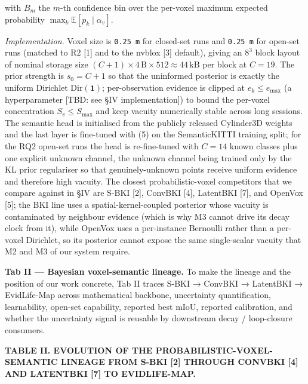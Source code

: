 \documentclass[
]{article}
\begin{document}
with \(B_m\) the \(m\)-th confidence bin over the per-voxel maximum
expected probability \(\max_k \mathbb{E}[p_k \mid \alpha_v]\).

\emph{Implementation.} Voxel size is \texttt{0.25\ m} for closed-set
runs and \texttt{0.25\ m} for open-set runs (matched to R2 {[}1{]} and
to the nvblox {[}3{]} default), giving an \(8^3\) block layout of
nominal storage size
\((C+1) \times 4\,\text{B} \times 512 \approx 44\,\text{kB}\) per block
at \(C = 19\). The prior strength is \(s_0 = C + 1\) so that the
uninformed posterior is exactly the uniform Dirichlet
\(\mathrm{Dir}(\mathbf{1})\); per-observation evidence is clipped at
\(e_k \le e_{\max}\) (a hyperparameter {[}TBD: see §IV
implementation{]}) to bound the per-voxel concentration
\(S_v \le S_{\max}\) and keep vacuity numerically stable across long
sessions. The semantic head is initialised from the publicly released
Cylinder3D weights and the last layer is fine-tuned with (5) on the
SemanticKITTI training split; for the RQ2 open-set runs the head is
re-fine-tuned with \(C = 14\) known classes plus one explicit unknown
channel, the unknown channel being trained only by the KL prior
regulariser so that genuinely-unknown points receive uniform evidence
and therefore high vacuity. The closest probabilistic-voxel competitors
that we compare against in §IV are S-BKI {[}2{]}, ConvBKI {[}4{]},
LatentBKI {[}7{]}, and OpenVox {[}5{]}; the BKI line uses a
spatial-kernel-coupled posterior whose vacuity is contaminated by
neighbour evidence (which is why M3 cannot drive its decay clock from
it), while OpenVox uses a per-instance Bernoulli rather than a per-voxel
Dirichlet, so its posterior cannot expose the same single-scalar vacuity
that M2 and M3 of our system require.

\textbf{Tab II --- Bayesian voxel-semantic lineage.} To make the lineage
and the position of our work concrete, Tab II traces S-BKI → ConvBKI →
LatentBKI → EvidLife-Map across mathematical backbone, uncertainty
quantification, learnability, open-set capability, reported best mIoU,
reported calibration, and whether the uncertainty signal is reusable by
downstream decay / loop-closure consumers.

\textbf{TABLE II. EVOLUTION OF THE PROBABILISTIC-VOXEL-SEMANTIC LINEAGE
FROM S-BKI {[}2{]} THROUGH CONVBKI {[}4{]} AND LATENTBKI {[}7{]} TO
EVIDLIFE-MAP.}
\end{document}
